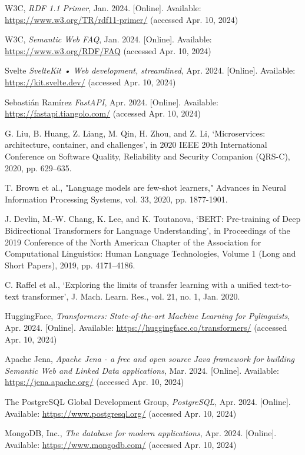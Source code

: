 \documentclass[a4paper,conference]{IEEEtran}
\begin{document}
\begin{thebibliography}{99}
W3C, \emph{RDF 1.1 Primer}, Jan. 2024. [Online]. Available: \url{https://www.w3.org/TR/rdf11-primer/} (accessed Apr. 10, 2024)

W3C, \emph{Semantic Web FAQ}, Jan. 2024. [Online]. Available: \url{https://www.w3.org/RDF/FAQ}  (accessed Apr. 10, 2024)

Svelte \emph{SvelteKit • Web development, streamlined}, Apr. 2024. [Online]. Available: \url{https://kit.svelte.dev/} (accessed Apr. 10, 2024)

Sebastián Ramírez \emph{FastAPI}, Apr. 2024. [Online]. Available: \url{https://fastapi.tiangolo.com/} (accessed Apr. 10, 2024)

G. Liu, B. Huang, Z. Liang, M. Qin, H. Zhou, and Z. Li, ‘Microservices: architecture, container, and challenges’, in 2020 IEEE 20th International Conference on Software Quality, Reliability and Security Companion (QRS-C), 2020, pp. 629–635.

T. Brown et al., "Language models are few-shot learners," Advances in Neural Information Processing Systems, vol. 33, 2020, pp. 1877-1901.

J. Devlin, M.-W. Chang, K. Lee, and K. Toutanova, ‘BERT: Pre-training of Deep Bidirectional Transformers for Language Understanding’, in Proceedings of the 2019 Conference of the North American Chapter of the Association for Computational Linguistics: Human Language Technologies, Volume 1 (Long and Short Papers), 2019, pp. 4171–4186.

C. Raffel et al., ‘Exploring the limits of transfer learning with a unified text-to-text transformer’, J. Mach. Learn. Res., vol. 21, no. 1, Jan. 2020.

HuggingFace, \emph{Transformers: State-of-the-art Machine Learning for Pylinguists}, Apr. 2024. [Online]. Available: \url{https://huggingface.co/transformers/} (accessed Apr. 10, 2024)

Apache Jena, \emph{Apache Jena - a free and open source Java framework for building Semantic Web and Linked Data applications}, Mar. 2024. [Online]. Available: \url{https://jena.apache.org/} (accessed Apr. 10, 2024)

The PostgreSQL Global Development Group, \emph{PostgreSQL}, Apr. 2024. [Online]. Available: \url{https://www.postgresql.org/} (accessed Apr. 10, 2024)

MongoDB, Inc., \emph{The database for modern applications}, Apr. 2024. [Online]. Available: \url{https://www.mongodb.com/} (accessed Apr. 10, 2024)


\end{thebibliography}
\end{document}
